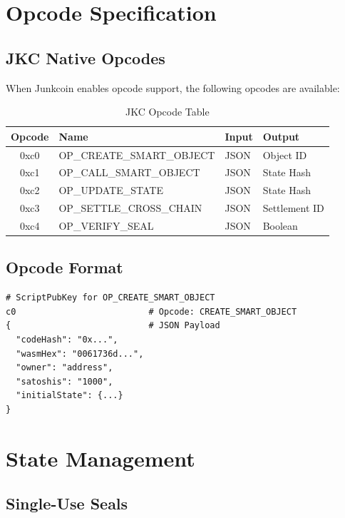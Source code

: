 \documentclass[a4paper,11pt]{article}
\begin{document}
\section{Opcode Specification}

\subsection{JKC Native Opcodes}

When Junkcoin enables opcode support, the following opcodes are available:

\begin{table}[h]
\centering
\begin{tabular}{@{}clll@{}}
\toprule
\textbf{Opcode} & \textbf{Name} & \textbf{Input} & \textbf{Output} \\
\midrule
0xc0 & OP\_CREATE\_SMART\_OBJECT & JSON & Object ID \\
0xc1 & OP\_CALL\_SMART\_OBJECT & JSON & State Hash \\
0xc2 & OP\_UPDATE\_STATE & JSON & State Hash \\
0xc3 & OP\_SETTLE\_CROSS\_CHAIN & JSON & Settlement ID \\
0xc4 & OP\_VERIFY\_SEAL & JSON & Boolean \\
\bottomrule
\end{tabular}
\caption{JKC Opcode Table}
\end{table}

\subsection{Opcode Format}

\begin{lstlisting}[language={}, caption={Opcode Structure}]
# ScriptPubKey for OP_CREATE_SMART_OBJECT
c0                          # Opcode: CREATE_SMART_OBJECT
{                           # JSON Payload
  "codeHash": "0x...",
  "wasmHex": "0061736d...",
  "owner": "address",
  "satoshis": "1000",
  "initialState": {...}
}
\end{lstlisting}

\section{State Management}

\subsection{Single-Use Seals}
\end{document}
